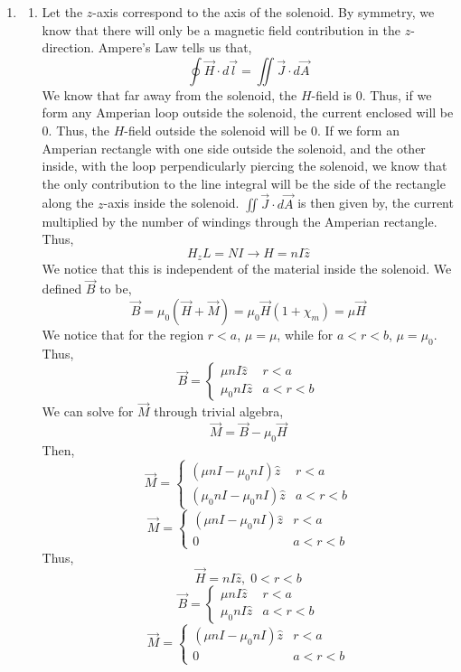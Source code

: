 \documentclass[12pt]{article}
\begin{document}
\begin{enumerate}
	\item [4.2]
	\begin{enumerate}
		\item [a.]
		Let the $z$-axis correspond to the axis of the solenoid.
		By symmetry, we know that there will only be a magnetic field contribution in the $z$-direction.
		Ampere's Law tells us that,
		\[\oint \vec H \cdot d\vec l = \iint \vec J \cdot d\vec A\]
		We know that far away from the solenoid, the $H$-field is $0$.
		Thus, if we form any Amperian loop outside the solenoid, the current enclosed will be $0$.
		Thus, the $H$-field outside the solenoid will be $0$.
		If we form an Amperian rectangle with one side outside the solenoid, and the other inside, with the loop perpendicularly piercing the solenoid, we know that the only contribution to the line integral will be the side of the rectangle along the $z$-axis inside the solenoid.
		$\iint \vec J \cdot d\vec A$ is then given by, the current multiplied by the number of windings through the Amperian rectangle.
		Thus,
		\[H_zL = NI \to H = nI\hat z\]
		We notice that this is independent of the material inside the solenoid.
		We defined $\vec B$ to be,
		\[\vec B=\mu_0(\vec H + \vec M)=\mu_0\vec H(1+\chi_m)=\mu \vec H\]
		We notice that for the region $r<a$, $\mu=\mu$, while for $a<r<b$, $\mu=\mu_0$.
		Thus,
		\[\vec B = \begin{cases}
			\mu nI \hat z & r < a \\ 
			\mu_0 nI \hat z & a < r < b	
		\end{cases}\]
		We can solve for $\vec M$ through trivial algebra,
		\[\vec M = \vec B - \mu_0 \vec H\]
		Then,
		\[\vec M = \begin{cases}
			(\mu nI-\mu_0 nI) \hat z & r < a \\ 
			(\mu_0 nI-\mu_0nI) \hat z & a < r < b	
		\end{cases}\]
		\[\vec M = \begin{cases}
			(\mu nI-\mu_0 nI) \hat z & r < a \\ 
			0 & a < r < b	
		\end{cases}\]
		Thus,
		\[\boxed{\vec H = nI \hat z, \; 0 < r < b}\]
		\[\boxed{\vec B = \begin{cases}
			\mu nI \hat z & r < a \\ 
			\mu_0 nI \hat z & a < r < b	
		\end{cases}}\]
		\[\boxed{\vec M = \begin{cases}
			(\mu nI-\mu_0 nI) \hat z & r < a \\ 
			0 & a < r < b	
		\end{cases}}\]


\end{enumerate}
\end{enumerate}
\end{document}
